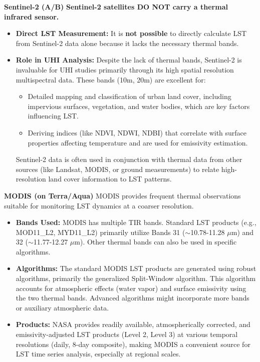 \documentclass{article}
\begin{document}
\noindent \textbf{Sentinel-2 (A/B)}
\newline
\textbf{Sentinel-2 satellites DO NOT carry a thermal infrared sensor.}\cite{sentinelESA}
\begin{itemize}
    \item \textbf{Direct LST Measurement:} It is \textbf{not possible} to directly calculate LST from Sentinel-2 data alone because it lacks the necessary thermal bands.
    \item \textbf{Role in UHI Analysis:} Despite the lack of thermal bands, Sentinel-2 is invaluable for UHI studies primarily through its high spatial resolution multispectral data\cite{sentinelESA}. These bands (10m, 20m) are excellent for:
    \begin{itemize}
        \item Detailed mapping and classification of urban land cover, including impervious surfaces, vegetation, and water bodies, which are key factors influencing LST.
        \item Deriving indices (like NDVI, NDWI, NDBI) that correlate with surface properties affecting temperature and are used for emissivity estimation.
    \end{itemize}
    Sentinel-2 data is often used in conjunction with thermal data from other sources (like Landsat, MODIS, or ground measurements) to relate high-resolution land cover information to LST patterns.
\end{itemize}

\vspace{1em}

\noindent \textbf{MODIS (on Terra/Aqua)}
\newline
MODIS provides frequent thermal observations suitable for monitoring LST dynamics at a coarser resolution\cite{modisNASA}.
\begin{itemize}
    \item \textbf{Bands Used:} MODIS has multiple TIR bands. Standard LST products (e.g., MOD11\_L2, MYD11\_L2) primarily utilize Bands 31 ($\sim$10.78-11.28 $\mu$m) and 32 ($\sim$11.77-12.27 $\mu$m)\cite{modisNASA}. Other thermal bands can also be used in specific algorithms.
    \item \textbf{Algorithms:} The standard MODIS LST products are generated using robust algorithms, primarily the generalized Split-Window algorithm\cite{modisLST}. This algorithm accounts for atmospheric effects (water vapor) and surface emissivity using the two thermal bands.
    Advanced algorithms might incorporate more bands or auxiliary atmospheric data.
    \item \textbf{Products:} NASA provides readily available, atmospherically corrected, and emissivity-adjusted LST products (Level 2, Level 3) at various temporal resolutions (daily, 8-day composite), making MODIS a convenient source for LST time series analysis, especially at regional scales\cite{modisNASA}.
\end{itemize}

\vfill


\end{document}

